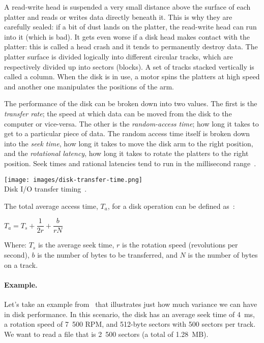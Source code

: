 A read-write head is suspended a very small distance above the surface of each platter and reads or writes data directly beneath it. This is why they are carefully sealed: if a bit of dust lands on the platter, the read-write head can run into it (which is bad). It gets even worse if a disk head makes contact with the platter: this is called a head crash and it tends to permanently destroy data. The platter surface is divided logically into different circular tracks, which are respectively divided up into sectors (blocks). A set of tracks stacked vertically is called a column. When the disk is in use, a motor spins the platters at high speed and another one manipulates the positions of the arm.

The performance of the disk can be broken down into two values. The first is the \textit{transfer rate}; the speed at which data can be moved from the disk to the computer or vice-versa. The other is the \textit{random-access time}; how long it takes to get to a particular piece of data. The random access time itself is broken down into the \textit{seek time}, how long it takes to move the disk arm to the right position, and the \textit{rotational latency}, how long it takes to rotate the platters to the right position. Seek times and rational latencies tend to run in the millisecond range~\cite{osc}.

\begin{center}
	\texttt{[image: images/disk-transfer-time.png]}\\
	Disk I/O transfer timing~\cite{osi}.
\end{center}

The total average access time, $T_{a}$, for a disk operation can be defined as~\cite{osi}:

\begin{center}
$T_{a} = T_{s} + \dfrac{1}{2r} + \dfrac{b}{rN}$
\end{center}
Where: $T_{s}$ is the average seek time, $r$ is the rotation speed (revolutions per second), $b$ is the number of bytes to be transferred, and $N$ is the number of bytes on a track.

\paragraph{Example.} Let's take an example from~\cite{osi} that illustrates just how much variance we can have in disk performance. In this scenario, the disk has an average seek time of 4~ms, a rotation speed of 7~500 RPM, and 512-byte sectors with 500 sectors per track. We want to read a file that is 2~500 sectors (a total of 1.28~MB). 

